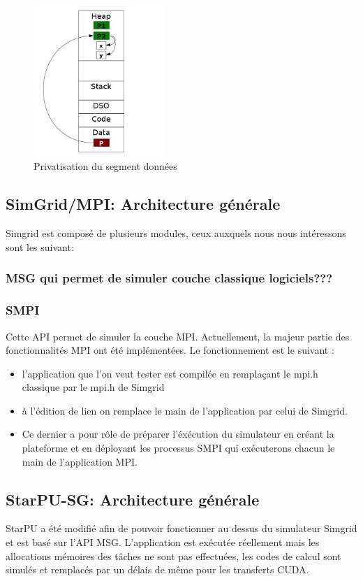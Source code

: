 \documentclass[smallextended]{svjour3}
\begin{document}
\begin{figure}[htb]
\centering
\includegraphics[width=5cm]{./Img/Memoire.jpg}
\caption{\label{fig:1}Privatisation du segment données}
\end{figure}

\subsection{SimGrid/MPI: Architecture générale}
\label{sec-3-2}
Simgrid est composé de plusieurs modules, ceux auxquels nous nous
intéressons sont les suivant: 
\subsubsection{MSG qui permet de simuler couche classique logiciels???}
\label{sec-3-2-1}
\subsubsection{SMPI}
\label{sec-3-2-2}
Cette API permet de simuler la couche MPI. Actuellement, la majeur
partie des fonctionnalités MPI ont été implémentées. 
Le fonctionnement est le suivant :
\begin{itemize}
\item l'application que l'on veut tester est compilée en remplaçant
le mpi.h classique par le mpi.h de Simgrid
\item à l'édition de lien on remplace le main de l'application par
celui de Simgrid.
\item Ce dernier a pour rôle de préparer l'éxécution du simulateur
en créant la plateforme et en déployant les processus SMPI qui
exécuterons chacun le main de l'application MPI.
\end{itemize}

\subsection{StarPU-SG: Architecture générale}
\label{sec-3-3}
StarPU a été modifié afin de pouvoir fonctionner au dessus du
simulateur Simgrid et est basé sur l'API MSG. L'application est
exécutée réellement mais les allocations mémoires des tâches ne
sont pas effectuées, les codes de calcul sont simulés et remplacés
par un délais de même pour les transferts CUDA.
\end{document}
